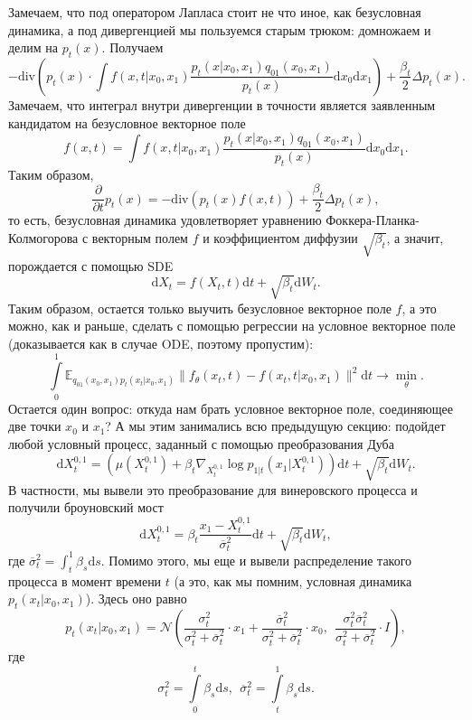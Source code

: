 \documentclass[12pt]{article}
\theoremstyle{definition}
\begin{document}
Замечаем, что под оператором Лапласа стоит не что иное, как безусловная динамика, а под дивергенцией мы пользуемся старым трюком: домножаем и делим на $p_t(x)$. Получаем
\[
    - \text{div}\left(p_t(x) \cdot \int f(x, t |x_0, x_1) \frac{p_t(x | x_0, x_1)q_{01}(x_0, x_1)}{p_t(x)} \mathrm{d} x_0 \mathrm{d} x_1 \right) + \frac{\beta_t}{2} \Delta p_t(x).
\]
Замечаем, что интеграл внутри дивергенции в точности является заявленным кандидатом на безусловное векторное поле
\[
    f(x, t) = \int f(x, t | x_0, x_1)\frac{p_t(x | x_0, x_1)q_{01}(x_0, x_1)}{p_t(x)} \mathrm{d}x_0 \mathrm{d} x_1.
\]
Таким образом,
\[
    \frac{\partial}{\partial t} p_t(x) = -\text{div}\left(p_t(x) f(x, t)\right) + \frac{\beta_t}{2} \Delta p_t(x),
\]
то есть, безусловная динамика удовлетворяет уравнению Фоккера-Планка-Колмогорова с векторным полем $f$ и коэффициентом диффузии $\sqrt{\beta_t}$, а значит, порождается с помощью SDE
\[
    \mathrm{d} X_t = f(X_t, t) \mathrm{d} t + \sqrt{\beta_t} \mathrm{d} W_t.
\]
Таким образом, остается только выучить безусловное векторное поле $f$, а это можно, как и раньше, сделать с помощью регрессии на условное векторное поле (доказывается как в случае ODE, поэтому пропустим):
\[
    \int\limits_{0}^{1} \mathbb{E}_{q_{01}(x_0, x_1)p_t(x_t | x_0, x_1)} \| f_\theta(x_t, t) - f(x_t, t | x_0, x_1) \|^2 \mathrm{d} t \rightarrow \min\limits_{\theta}.
\]
Остается один вопрос: откуда нам брать условное векторное поле, соединяющее две точки $x_0$ и $x_1$? А мы этим занимались всю предыдущую секцию: подойдет любой условный процесс, заданный с помощью преобразования Дуба
\[
    \mathrm{d} X_t^{0, 1} =\left(\mu(X_t^{0, 1}) + \beta_t \nabla_{X_t^{0, 1}} \log p_{1 | t}(x_1 | X_t^{0, 1}) \right)\mathrm{d} t + \sqrt{\beta_t} \mathrm{d} W_t.
\]
В частности, мы вывели это преобразование для винеровского процесса и получили броуновский мост
\[
    \mathrm{d} X_t^{0, 1} = \beta_t \frac{x_1 - X_t^{0, 1}}{\overline{\sigma}^2_t} \mathrm{d} t + \sqrt{\beta_t}\mathrm{d} W_t,
\]
где $\overline{\sigma}^2_t = \int_t^{1}\beta_s \mathrm{d} s$. Помимо этого, мы еще и вывели распределение такого процесса в момент времени $t$ (а это, как мы помним, условная динамика $p_t(x_t | x_0, x_1)$). Здесь оно равно
\[
    p_t(x_t | x_0, x_1) = \mathcal{N}\left(\frac{\sigma^2_t}{\sigma^2_t + \overline{\sigma}^2_t} \cdot x_1 + \frac{\overline{\sigma}^2_t}{\sigma^2_t + \overline{\sigma}^2_t} \cdot x_0, \:\: \frac{\sigma^2_t \overline{\sigma}^2_t}{\sigma^2_t + \overline{\sigma}^2_t} \cdot I  \right),
\]
где
\[
    \sigma^2_t = \int \limits_{0}^{t} \beta_s \mathrm{d} s, \:\: \overline{\sigma}^2_t = \int \limits_{t}^{1} \beta_s \mathrm{d} s.
\]
\end{document}
